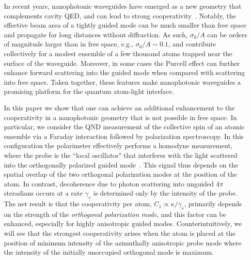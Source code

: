 \documentclass[aps,pra,twocolumn,superscriptaddress]{revtex4-1} %
\begin{document}
In recent years, nanophotonic waveguides have emerged as a new geometry that complements cavity QED, and can lead to strong cooperativity~\cite{Vetsch2010Optical, Chang2013,  Hung2013, Yu2014,  Douglas2015, Asenjo-Garcia2017Exponential, Qi2016}.  Notably, the effective beam area of a tightly guided mode can be much smaller than free space and propagate for long distances without diffraction.  As such,  $\sigma_0/A$ can be orders of magnitude larger than in free space, e.g., $\sigma_0/A \sim 0.1$, and contribute collectively for a modest ensemble of a few thousand atoms trapped near the surface of the waveguide.  Moreover, in some cases the Purcell effect can further enhance forward scattering into the guided mode when compared with scattering into free space.  Taken together, these features make  nanophotonic waveguides a promising platform for the quantum atom-light interface.  
 
In this paper we show that one can achieve an additional enhancement to the cooperativity in a nanophotonic geometry that is not possible in free space. In particular, we consider the QND measurement of the collective spin of an atomic ensemble via a Faraday interaction followed by polarization spectroscopy.  In this configuration the polarimeter effectively performs a homodyne measurement, where the probe is the ``local oscillator" that interferes with the light scattered into the orthogonally polarized guided mode~\cite{Baragiola2014}.   This signal thus depends on the spatial overlap of the two orthogonal polarization modes at the position of the atom.  In contrast, decoherence due to photon scattering into unguided $4 \pi$ steradians occurs at a rate $\gamma_s$ is determined only by the intensity of the probe.   The net result is that the cooperativity per atom, $C_1 \propto \kappa/\gamma_s$, primarily depends on the strength of the {\em orthogonal polarization mode}, and this factor can be enhanced, especially for highly anisotropic guided modes.  Counterintuitively, we will see that the strongest cooperativity arises when the atom is placed at the position of  minimum intensity of the azimuthally anisotropic probe mode where the intensity of the initially unoccupied orthogonal mode is maximum. 
\end{document}
